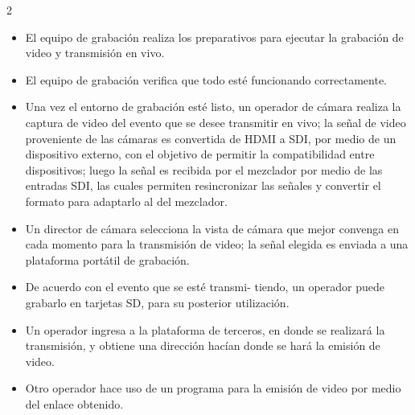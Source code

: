 \documentclass[12pt,spanish,Letterpaper,openany]{book}
\providecommand{\tightlist}{%
  \setlength{\itemsep}{0pt}\setlength{\parskip}{0pt}}
\newcommand{\spacetwomilis}{\vspace{2mm}}
\begin{document}
\begin {multicols}{2}
\begin{itemize}
\tightlist
\item
  El equipo de grabación realiza los preparativos para ejecutar la grabación de video y transmisión en vivo.
\end{itemize}

\spacetwomilis

\begin{itemize}
\tightlist
\item
  El equipo de grabación verifica que todo esté funcionando correctamente.
\end{itemize}

\spacetwomilis

\begin{itemize}
\tightlist
\item
  Una vez el entorno de grabación esté listo, un operador de cámara realiza la captura de video del evento que se desee transmitir en vivo; la señal de video proveniente de las cámaras es convertida de HDMI a SDI, por medio de un dispositivo externo, con el objetivo de permitir la compatibilidad entre dispositivos; luego la señal es recibida por el mezclador por medio de las entradas SDI, las cuales permiten resincronizar las señales y convertir el formato para adaptarlo al del mezclador.
\end{itemize}

\spacetwomilis

\begin{itemize}
\item
  Un director de cámara selecciona la vista de cámara que mejor convenga en cada momento para la transmisión de video; la señal elegida es enviada a una plataforma portátil de grabación.
\item
  De acuerdo con el evento que se esté transmi-
  tiendo, un operador puede grabarlo en tarjetas SD, para su posterior utilización.
\end{itemize}

\spacetwomilis

\begin{itemize}
\tightlist
\item
  Un operador ingresa a la plataforma de terceros, en donde se realizará la transmisión, y obtiene una dirección hacían donde se hará la emisión de video.
\end{itemize}

\spacetwomilis

\begin{itemize}
\tightlist
\item
  Otro operador hace uso de un programa para la emisión de video por medio del enlace obtenido.
\end{itemize}


\end{multicols}
\end{document}
